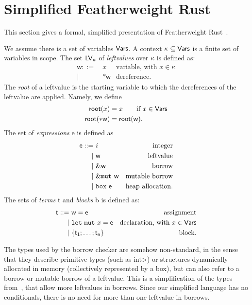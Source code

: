 \section{Simplified Featherweight Rust}\label{sec:featherweight}

This section gives a formal, simplified presentation of Featherweight
Rust~\cite{Pearce21}.

\begin{definition}
  We assume there is a set of variables $\mathsf{Vars}$.
  A context $\kappa\subseteq\mathsf{Vars}$ is a finite set of variables in scope.
  The set $\mathsf{LV}_\kappa$ of \emph{leftvalues} over $\kappa$ is defined as:
  \begin{align*}
    \mathsf{w} ::= &\ x & \text{variable, with $x\in\kappa$}\\
    | &\ \mathtt{*}\mathsf{w} & \text{dereference.}
  \end{align*}
  The \emph{root} of a leftvalue is the starting variable to which the dereferences of the
  leftvalue are applied. Namely, we define
  \begin{align*}
    \mathsf{root}(x) &= x\qquad\text{if $x\in\mathsf{Vars}$}\\
    \mathsf{root}(\mathtt{*}\mathsf{w}) &= \mathsf{root}(\mathsf{w}).
  \end{align*}
  The set of \emph{expressions} \textsf{e} is defined as
  \begin{align*}
    \mathsf{e} ::= &\ i & \text{integer}\\
    | &\ \mathsf{w} & \text{leftvalue}\\
    | &\ \&\mathsf{w} & \text{borrow}\\
    | &\ \&\mathtt{mut}\ \mathsf{w} & \text{mutable borrow}\\
    | &\ \mathtt{box}\ \mathsf{e} & \text{heap allocation.}
  \end{align*}
  The sets of \emph{terms} \textsf{t} and \emph{blocks} \textsf{b} is defined as:
  \begin{align*}
    \mathsf{t} ::= &\ \mathsf{w}=\mathsf{e} & \text{assignment}\\
    | &\ \mathtt{let\ mut}\ x=\mathsf{e} & \text{declaration, with $x\in\mathsf{Vars}$}\\
    | &\ \{\mathsf{t_1};\ldots;\mathsf{t_n}\} & \text{block.}
  \end{align*}
\end{definition}

The types used by the borrow checker are somehow non-standard, in the sense
that they describe primitive types (such as \<int>) or structures
dynamically allocated in memory (collectively represented by a box), but can also refer to
a borrow or mutable borrow of a leftvalue.
This is a simplification of the types from~\cite{Pearce21}, that allow more leftvalues
in borrows. Since our simplified language has no conditionals, there is no need for
more than one leftvalue in borrows.

